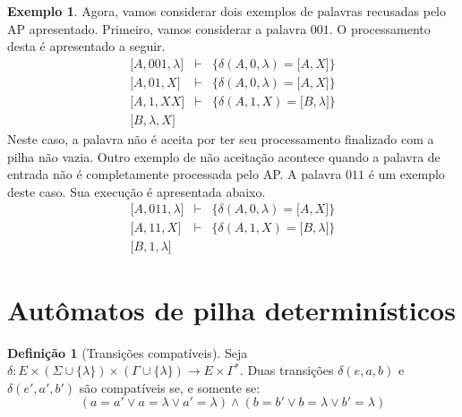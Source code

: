 \documentclass[a4paper]{article}
\theoremstyle{definition}
\newtheorem{Example}{Exemplo}
\newtheorem{Definition}{Definição}
\begin{document}
\begin{Example}
    Agora, vamos considerar dois exemplos de palavras recusadas pelo AP
    apresentado. Primeiro, vamos considerar a palavra $001$. O processamento
    desta é apresentado a seguir.
    \[
      \begin{array}{lcl}
        \lbrack A,001,\lambda \rbrack & \vdash & \{\delta(A,0,\lambda) =
                                                  \lbrack A, X \rbrack\} \\
        \lbrack A,01, X \rbrack & \vdash & \{\delta(A,0,\lambda) =
                                            \lbrack A, X \rbrack\} \\
        \lbrack A,1, XX \rbrack & \vdash & \{\delta(A,1,X) =
                                            \lbrack B, \lambda \rbrack\} \\
        \lbrack B,\lambda,X \rbrack 
      \end{array}
    \]
    Neste caso, a palavra não é aceita por ter seu processamento finalizado com
    a pilha não vazia. Outro exemplo de não aceitação acontece quando a palavra
    de entrada não é completamente processada pelo AP. A palavra $011$ é um
    exemplo deste caso. Sua execução é apresentada abaixo.
    \[
      \begin{array}{lcl}
        \lbrack A,011,\lambda \rbrack & \vdash & \{\delta(A,0,\lambda) =
                                                  \lbrack A, X \rbrack\} \\
        \lbrack A,11, X \rbrack & \vdash & \{\delta(A,1,X) =
                                            \lbrack B, \lambda \rbrack\} \\
        \lbrack B,1,\lambda \rbrack 
      \end{array}
    \]
  \end{Example}

  \section{Autômatos de pilha determinísticos}

  \begin{Definition}[Transições compatíveis]
    Seja $\delta : E \times (\Sigma \cup \{\lambda\}) \times (\Gamma \cup
    \{\lambda\}) \to E \times \Gamma^*$. Duas transições $\delta(e,a,b)$ e
    $\delta(e',a',b')$ são compatíveis se, e somente se:
    \[
      (a = a' \lor a = \lambda \lor a' = \lambda) \land (b = b' \lor b = \lambda \lor b' = \lambda)
    \]
  \end{Definition}
\end{document}
